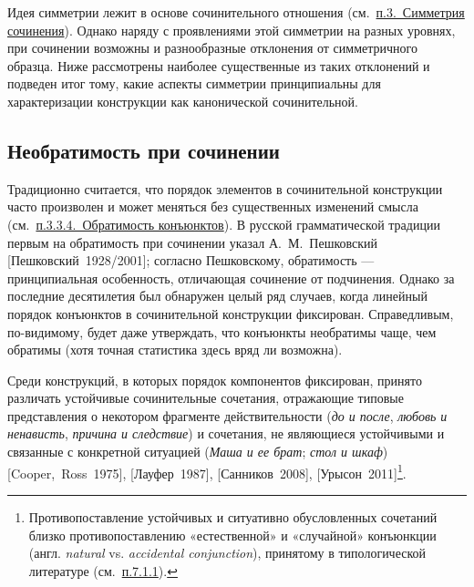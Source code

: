 Идея симметрии лежит в основе сочинительного отношения
(см.~\underline{п.3.~Симметрия сочинения}). Однако наряду с проявлениями
этой симметрии на разных уровнях, при сочинении возможны и разнообразные
отклонения от симметричного образца. Ниже рассмотрены наиболее
существенные из таких отклонений и подведен итог тому, какие аспекты
симметрии принципиальны для характеризации конструкции как канонической
сочинительной.

\subsection{Необратимость при
сочинении}\label{ux43dux435ux43eux431ux440ux430ux442ux438ux43cux43eux441ux442ux44c-ux43fux440ux438-ux441ux43eux447ux438ux43dux435ux43dux438ux438}

Традиционно считается, что порядок элементов в сочинительной конструкции
часто произволен и может меняться без существенных изменений смысла
(см.~\underline{п.3.3.4.~Обратимость конъюнктов}). В русской
грамматической традиции первым на обратимость при сочинении указал
А.~М.~Пешковский {[}Пешковский~1928/2001{]}; согласно Пешковскому,
обратимость --- принципиальная особенность, отличающая сочинение от
подчинения. Однако за последние десятилетия был обнаружен целый ряд
случаев, когда линейный порядок конъюнктов в сочинительной конструкции
фиксирован. Справедливым, по-видимому, будет даже утверждать, что
конъюнкты необратимы чаще, чем обратимы (хотя точная статистика здесь
вряд ли возможна).

Среди конструкций, в которых порядок компонентов фиксирован, принято
различать устойчивые сочинительные сочетания, отражающие типовые
представления о некотором фрагменте действительности (\textit{до и после},
\textit{любовь и ненависть}, \textit{причина и следствие}) и сочетания, не
являющиеся устойчивыми и связанные с конкретной ситуацией (\textit{Маша и
ее брат}; \textit{стол и шкаф}) {[}Cooper,~Ross~1975{]},
{[}Лауфер~1987{]}, {[}Санников~2008{]}, {[}Урысон~2011{]}\footnote{Противопоставление
  устойчивых и ситуативно обусловленных сочетаний близко
  противопоставлению «естественной» и «случайной» конъюнкции (англ.
  \textit{natural} vs. \textit{accidental conjunction}), принятому в
  типологической литературе (см.~\underline{п.7.1.1}).}.

